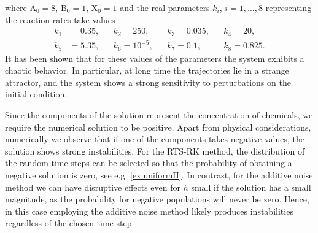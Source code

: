 \documentclass[10pt]{article}
\begin{document}
where $\mathrm{A}_0 = 8$, $\mathrm{B}_0 = 1$, $\mathrm{X}_0 = 1$ and the real parameters $k_i$, $i = 1, \ldots, 8$ representing the reaction rates take values
\begin{equation}
\begin{aligned}
k_1 &= 0.35, &&k_2 = 250, &&k_3 = 0.035, &&k_4 = 20,\\
k_5 &= 5.35, &&k_6 = 10^{-5}, &&k_7 = 0.1, &&k_8 = 0.825.
\end{aligned}
\end{equation}            
It has been shown \cite{Ols83} that for these values of the parameters the system exhibits a chaotic behavior. In particular, at long time the trajectories lie in a strange attractor, and the system shows a strong sensitivity to perturbations on the initial condition. 

Since the components of the solution represent the concentration of chemicals, we require the numerical solution to be positive. Apart from physical considerations, numerically we observe that if one of the components takes negative values, the solution shows strong instabilities. For the RTS-RK method, the distribution of the random time steps can be selected so that the probability of obtaining a negative solution is zero, see e.g. \cref{ex:uniformH}. In contrast, for the additive noise method we can have disruptive effects even for $h$ small if the solution has a small magnitude, as the probability for negative populations will never be zero. Hence, in this case employing the additive noise method likely produces instabilities regardless of the chosen time step.
\end{document}

